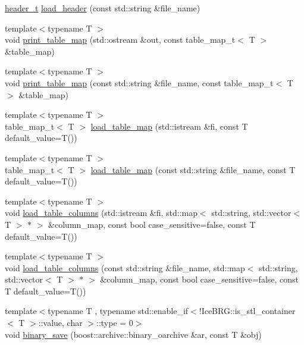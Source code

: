 \begin{DoxyCompactItemize}
\item 
\hyperlink{namespaceIceBRG_a49e8b48f1dbd351e9748e7cbe80705df}{header\-\_\-t} \hyperlink{namespaceIceBRG_adc28049500e5c5e79d321cc31847267a}{load\-\_\-header} (const std\-::string \&file\-\_\-name)
\item 
{\footnotesize template$<$typename T $>$ }\\void \hyperlink{namespaceIceBRG_a1379800d6e0cafd9a437e456e95a3b1f}{print\-\_\-table\-\_\-map} (std\-::ostream \&out, const table\-\_\-map\-\_\-t$<$ T $>$ \&table\-\_\-map)
\item 
{\footnotesize template$<$typename T $>$ }\\void \hyperlink{namespaceIceBRG_aabd3e256b75420ca59af04c81c9bae99}{print\-\_\-table\-\_\-map} (const std\-::string \&file\-\_\-name, const table\-\_\-map\-\_\-t$<$ T $>$ \&table\-\_\-map)
\item 
{\footnotesize template$<$typename T $>$ }\\table\-\_\-map\-\_\-t$<$ T $>$ \hyperlink{namespaceIceBRG_a845530aefc4255d4d98730502e0ad5b6}{load\-\_\-table\-\_\-map} (std\-::istream \&fi, const T default\-\_\-value=T())
\item 
{\footnotesize template$<$typename T $>$ }\\table\-\_\-map\-\_\-t$<$ T $>$ \hyperlink{namespaceIceBRG_a3f55c2c1511c52252fc04d73b77fe777}{load\-\_\-table\-\_\-map} (const std\-::string \&file\-\_\-name, const T default\-\_\-value=T())
\item 
{\footnotesize template$<$typename T $>$ }\\void \hyperlink{namespaceIceBRG_ac0ffd49fd81c88cfada1e555c0bef325}{load\-\_\-table\-\_\-columns} (std\-::istream \&fi, std\-::map$<$ std\-::string, std\-::vector$<$ T $>$ $\ast$ $>$ \&column\-\_\-map, const bool case\-\_\-sensitive=false, const T default\-\_\-value=T())
\item 
{\footnotesize template$<$typename T $>$ }\\void \hyperlink{namespaceIceBRG_a613f4da18fa3608894513caf3abeb80a}{load\-\_\-table\-\_\-columns} (const std\-::string \&file\-\_\-name, std\-::map$<$ std\-::string, std\-::vector$<$ T $>$ $\ast$ $>$ \&column\-\_\-map, const bool case\-\_\-sensitive=false, const T default\-\_\-value=T())
\item 
{\footnotesize template$<$typename T , typename std\-::enable\-\_\-if$<$!\-Ice\-B\-R\-G\-::is\-\_\-stl\-\_\-container$<$ T $>$\-::value, char $>$\-::type  = 0$>$ }\\void \hyperlink{namespaceIceBRG_a8ad6dd269bdf0b61bfa03156b7334896}{binary\-\_\-save} (boost\-::archive\-::binary\-\_\-oarchive \&ar, const T \&obj)

\end{DoxyCompactItemize}
